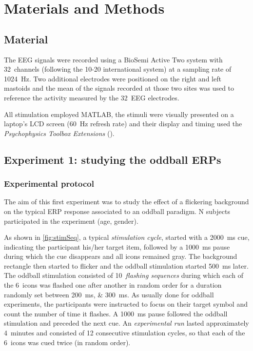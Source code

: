 \documentclass[10pt]{article}
\begin{document}
\section{Materials and Methods}
\label{sec:2MatAndMet}

    \subsection{Material}
    \label{sec:2.1Material}

    The EEG signals were recorded using a BioSemi Active Two system with 32~channels (following the 10-20 international system) at a sampling rate of \SI{1024}{\Hz}.
    Two additional electrodes were positioned on the right and left mastoids and the mean of the signals recorded at those two sites was used to reference the activity measured by the 32~EEG electrodes.

    All stimulation employed MATLAB\textsuperscript{\textregistered}, the stimuli were visually presented on a laptop's LCD screen (\SI{60}{\Hz} refresh rate) and their display and timing used the \emph{Psychophysics Toolbox Extensions} (\cite{Brainard1997,Pelli1997}).



    \subsection{Experiment 1: studying the oddball \acsp{ERP}}
    \label{sec:2.2Oddball}

        \subsubsection{Experimental protocol}
        \label{sec:2.2.1Protocol}

        The aim of this first experiment was to study the effect of a flickering background on the typical \ac{ERP} response associated to an oddball paradigm.
        N subjects participated in the experiment (age, gender).

        As shown in \autoref{fig:stimSeq}, a typical \emph{stimulation cycle}, started with a \SI{2000}{\ms} cue, indicating the participant his/her target item, followed by a \SI{1000}{\ms} pause during which the cue disappears and all icons remained gray.
        The background rectangle then started to flicker and the oddball stimulation started \SI{500}{\ms} later.
        The oddball stimulation consisted of 10~\emph{flashing sequences} during which each of the 6~icons was flashed one after another in random order for a duration randomly set between \SIlist[list-units = single]{200;300}{\ms}.
        As usually done for oddball experiments, the participants were instructed to focus on their target symbol and count the number of time it flashes.
        A \SI{1000}{\ms} pause followed the oddball stimulation and preceded the next cue.
        An \emph{experimental run} lasted approximately 4~minutes and consisted of 12 consecutive stimulation cycles, so that each of the 6~icons was cued twice (in random order).
\end{document}

